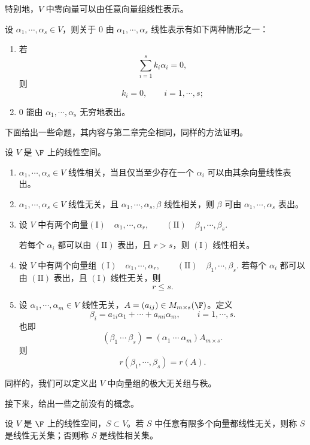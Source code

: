 特别地，$V$ 中零向量可以由任意向量组线性表示。

\begin{corollary}
	设 $\alpha_1,\cdots,\alpha_s\in V$，则关于 $0$ 由 $\alpha_1,\cdots,\alpha_s$ 线性表示有如下两种情形之一：
	\begin{enumerate}
		\item 若
		\[
		\sum_{i=1}^{s}k_i\alpha_i=0,
		\]
		则
		\[
		k_i=0,
		\qquad i=1,\cdots,s;
		\]
		\item $0$ 能由 $\alpha_1,\cdots,\alpha_s$ 无穷地表出。
	\end{enumerate}
\end{corollary}

下面给出一些命题，其内容与第二章完全相同，同样的方法证明。

\begin{proposition}
	设 $V$ 是 $\F$ 上的线性空间。
	\begin{enumerate}
		\item $\alpha_1,\cdots,\alpha_s\in V$ 线性相关，当且仅当至少存在一个 $\alpha_i$ 可以由其余向量线性表出。
		\item $\alpha_1,\cdots,\alpha_s\in V$ 线性无关，且 $\alpha_1,\cdots,\alpha_s,\beta$ 线性相关，则 $\beta$ 可由 $\alpha_1,\cdots,\alpha_s$ 表出。
		\item 设 $V$ 中有两个向量$ (\mathrm{I})\quad \alpha_1,\cdots,\alpha_r,
		\qquad
		(\mathrm{II})\quad \beta_1,\cdots,\beta_s.$
	
		若每个 $\alpha_i$ 都可以由 $(\mathrm{II})$ 表出，且 $r>s$，则 $(\mathrm{I})$ 线性相关。
		\item 设 $V$ 中有两个向量组
		$ (\mathrm{I})\quad \alpha_1,\cdots,\alpha_r,
		\qquad
		(\mathrm{II})\quad \beta_1,\cdots,\beta_s.$
		若每个 $\alpha_i$ 都可以由 $(\mathrm{II})$ 表出，且 $(\mathrm{I})$ 线性无关，则
		\[
		r\leq s.
		\]
		\item 设 $\alpha_1,\cdots,\alpha_m\in V$ 线性无关，$A=(a_{ij})\in M_{m\times s}(\F)$。定义
		\[
		\beta_i=a_{1i}\alpha_1+\cdots+a_{mi}\alpha_m,
		\qquad i=1,\cdots,s.
		\]
		也即
		\[
		(\beta_1\ \cdots\ \beta_s)
		=(\alpha_1\ \cdots\ \alpha_m)A_{m\times s}.
		\]
		则
		\[
		r(\beta_1,\cdots,\beta_s)=r(A).
		\]
	\end{enumerate}
\end{proposition}

同样的，我们可以定义出 $V$ 中向量组的极大无关组与秩。

接下来，给出一些之前没有的概念。 
\begin{definition}
	设 $V$ 是 $\F$ 上的线性空间，$S\subset V$。若 $S$ 中任意有限多个向量都线性无关，则称 $S$ 是线性无关集；否则称 $S$ 是线性相关集。
\end{definition}

